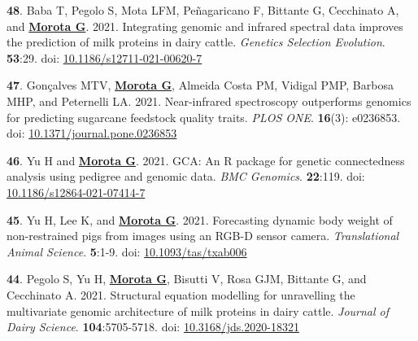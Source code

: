 \documentclass[margin,line,10pt]{res}
\newenvironment{list1}{
  \begin{list}{\ding{113}}{%
      \setlength{\itemsep}{0in}
      \setlength{\parsep}{0in} \setlength{\parskip}{0in}
      \setlength{\topsep}{0in} \setlength{\partopsep}{0in} 
      \setlength{\leftmargin}{0.17in}}}{\end{list}}
\begin{document}
\begin{resume}
\begin{list1}
\item [{\bf 48}.] Baba T, Pegolo S, Mota LFM, Pe\~{n}agaricano F, Bittante G, Cecchinato A, and \textbf{\underline{Morota G}}. 2021. Integrating genomic and infrared spectral data improves the prediction of milk proteins in dairy cattle. \emph{Genetics Selection Evolution}. \textbf{53}:29. doi: \textcolor{blue}{\href{https://doi.org/10.1186/s12711-021-00620-7}{10.1186/s12711-021-00620-7}}
  
  \vspace{0.5cm}
  
\item [{\bf 47}.] Gon\c{c}alves MTV, \textbf{\underline{Morota G}}, Almeida Costa PM, Vidigal PMP, Barbosa MHP, and Peternelli LA. 2021. Near-infrared spectroscopy outperforms genomics for predicting sugarcane feedstock quality traits.  \emph{PLOS ONE}. \textbf{16}(3): e0236853. doi: \textcolor{blue}{\href{https://doi.org/10.1371/journal.pone.0236853}{10.1371/journal.pone.0236853}}

  \vspace{0.5cm}

  \item  [{\bf 46}.] Yu H and \textbf{\underline{Morota G}}. 2021. GCA: An R package for genetic connectedness analysis using pedigree and genomic data. \emph{BMC Genomics}. \textbf{22}:119.  doi: \textcolor{blue}{\href{https://doi.org/10.1186/s12864-021-07414-7}{10.1186/s12864-021-07414-7}}

  \vspace{0.5cm}

  
\item [{\bf 45}.] Yu H, Lee K, and \textbf{\underline{Morota G}}. 2021. Forecasting dynamic body weight of non-restrained pigs from images using an RGB-D sensor camera. \emph{Translational Animal Science}. \textbf{5}:1-9. doi: \textcolor{blue}{\href{https://doi.org/10.1093/tas/txab006}{10.1093/tas/txab006}} 

  \vspace{0.5cm}
  
\item [{\bf 44}.] Pegolo S, Yu H, \textbf{\underline{Morota G}}, Bisutti V, Rosa GJM, Bittante G, and Cecchinato A. 2021. Structural equation modelling for unravelling the multivariate genomic architecture of milk proteins in dairy cattle. \emph{Journal of Dairy Science}. \textbf{104}:5705-5718.  doi: \textcolor{blue}{\href{https://doi.org/10.3168/jds.2020-18321}{10.3168/jds.2020-18321}} 

  \vspace{0.5cm}
  

\end{list1}
\end{resume}
\end{document}
